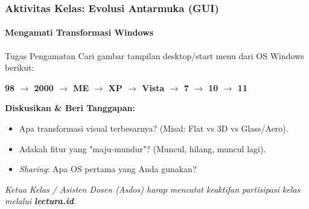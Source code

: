 \documentclass[t,aspectratio=169,xcolor=dvipsnames]{beamer}
\begin{document}
\begin{frame}[t]
    \frametitle{Aktivitas Kelas: Evolusi Antarmuka (GUI)}
    \framesubtitle{Mengamati Transformasi Windows}

    \begin{block}{Tugas Pengamatan}
        Cari gambar tampilan desktop/start menu dari OS Windows berikut:
        \begin{center}
            \textbf{98 $\rightarrow$ 2000 $\rightarrow$ ME $\rightarrow$ XP $\rightarrow$ Vista $\rightarrow$ 7 $\rightarrow$ 10 $\rightarrow$ 11}
        \end{center}
    \end{block}
    
    \textbf{Diskusikan \& Beri Tanggapan:}
    \begin{itemize}
        \item Apa transformasi visual terbesarnya? (Misal: Flat vs 3D vs Glass/Aero).
        \item Adakah fitur yang "maju-mundur"? (Muncul, hilang, muncul lagi).
        \item \textit{Sharing}: Apa OS pertama yang Anda gunakan?
    \end{itemize}

    \vspace{0.2cm}
    \textit{Ketua Kelas / Asisten Dosen (Asdos) harap mencatat keaktifan partisipasi kelas melalui \textbf{lectura.id}.}
    
\end{frame}
\end{document}

